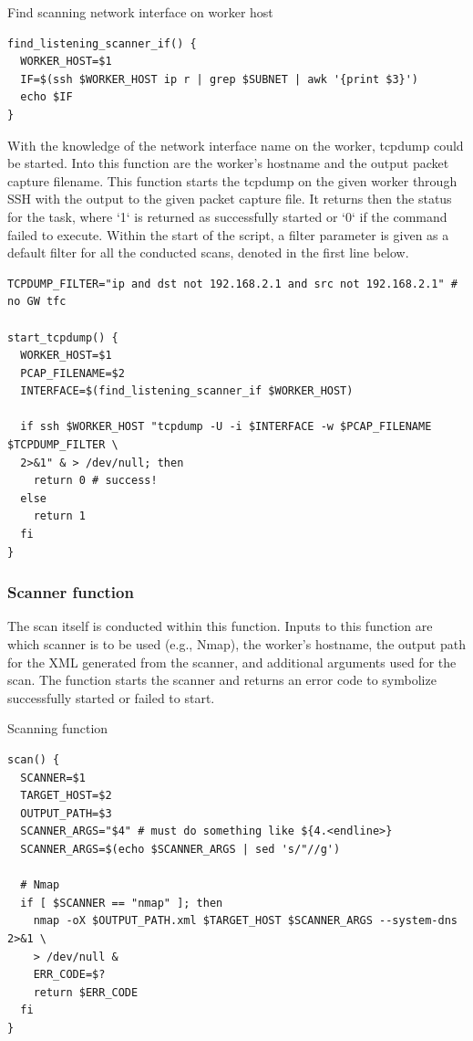 \begin{listing}[!ht]
\caption{Find scanning network interface on worker host}
\label{lst:ScanNIC}
\begin{verbatim}
find_listening_scanner_if() {
  WORKER_HOST=$1
  IF=$(ssh $WORKER_HOST ip r | grep $SUBNET | awk '{print $3}')
  echo $IF
}
\end{verbatim}
\end{listing}

With the knowledge of the network interface name on the worker, tcpdump could be started.
Into this function are the worker's hostname and the output packet capture filename.
This function starts the tcpdump on the given worker through SSH with the output to the given packet capture file.
It returns then the status for the task, where `1` is returned as successfully started or `0` if the command failed to execute.
Within the start of the script, a filter parameter is given as a default filter for all the conducted scans, denoted in the first line below.

\begin{verbatim}
TCPDUMP_FILTER="ip and dst not 192.168.2.1 and src not 192.168.2.1" # no GW tfc

start_tcpdump() {
  WORKER_HOST=$1
  PCAP_FILENAME=$2
  INTERFACE=$(find_listening_scanner_if $WORKER_HOST)

  if ssh $WORKER_HOST "tcpdump -U -i $INTERFACE -w $PCAP_FILENAME $TCPDUMP_FILTER \
  2>&1" & > /dev/null; then
    return 0 # success!
  else
    return 1
  fi
}
\end{verbatim}

\subsubsection{Scanner function}
\label{ss:ScannerFunction}
The scan itself is conducted within this function.
Inputs to this function are which scanner is to be used (e.g., Nmap), the worker's hostname, the output path for the XML generated from the scanner, and additional arguments used for the scan.
The function starts the scanner and returns an error code to symbolize successfully started or failed to start.

\begin{listing}[!ht]
\caption{Scanning function}
\label{lst:Scan}
\begin{verbatim}
scan() {
  SCANNER=$1
  TARGET_HOST=$2
  OUTPUT_PATH=$3
  SCANNER_ARGS="$4" # must do something like ${4.<endline>}
  SCANNER_ARGS=$(echo $SCANNER_ARGS | sed 's/"//g')

  # Nmap
  if [ $SCANNER == "nmap" ]; then
    nmap -oX $OUTPUT_PATH.xml $TARGET_HOST $SCANNER_ARGS --system-dns 2>&1 \
    > /dev/null &
    ERR_CODE=$?
    return $ERR_CODE
  fi
}
\end{verbatim}
\end{listing}

